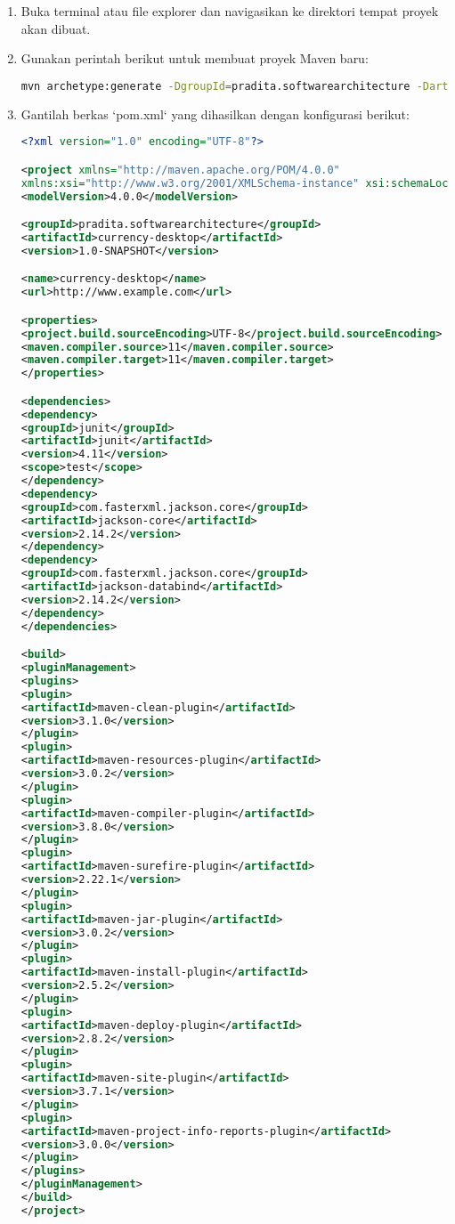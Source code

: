 \begin{enumerate}
\item Buka terminal atau file explorer dan navigasikan ke direktori tempat proyek akan dibuat.
\item Gunakan perintah berikut untuk membuat proyek Maven baru:

\begin{lstlisting}[language=bash]
mvn archetype:generate -DgroupId=pradita.softwarearchitecture -DartifactId=currency-desktop -DarchetypeArtifactId=maven-archetype-quickstart -DinteractiveMode=false
\end{lstlisting}

\item Gantilah berkas `pom.xml` yang dihasilkan dengan konfigurasi berikut:

\begin{lstlisting}[language=xml]
<?xml version="1.0" encoding="UTF-8"?>

<project xmlns="http://maven.apache.org/POM/4.0.0"
xmlns:xsi="http://www.w3.org/2001/XMLSchema-instance" xsi:schemaLocation="http://maven.apache.org/POM/4.0.0 http://maven.apache.org/xsd/maven-4.0.0.xsd">
<modelVersion>4.0.0</modelVersion>

<groupId>pradita.softwarearchitecture</groupId>
<artifactId>currency-desktop</artifactId>
<version>1.0-SNAPSHOT</version>

<name>currency-desktop</name>
<url>http://www.example.com</url>

<properties>
<project.build.sourceEncoding>UTF-8</project.build.sourceEncoding>
<maven.compiler.source>11</maven.compiler.source>
<maven.compiler.target>11</maven.compiler.target>
</properties>

<dependencies>
<dependency>
<groupId>junit</groupId>
<artifactId>junit</artifactId>
<version>4.11</version>
<scope>test</scope>
</dependency>
<dependency>
<groupId>com.fasterxml.jackson.core</groupId>
<artifactId>jackson-core</artifactId>
<version>2.14.2</version>
</dependency>
<dependency>
<groupId>com.fasterxml.jackson.core</groupId>
<artifactId>jackson-databind</artifactId>
<version>2.14.2</version>
</dependency>
</dependencies>

<build>
<pluginManagement>
<plugins>
<plugin>
<artifactId>maven-clean-plugin</artifactId>
<version>3.1.0</version>
</plugin>
<plugin>
<artifactId>maven-resources-plugin</artifactId>
<version>3.0.2</version>
</plugin>
<plugin>
<artifactId>maven-compiler-plugin</artifactId>
<version>3.8.0</version>
</plugin>
<plugin>
<artifactId>maven-surefire-plugin</artifactId>
<version>2.22.1</version>
</plugin>
<plugin>
<artifactId>maven-jar-plugin</artifactId>
<version>3.0.2</version>
</plugin>
<plugin>
<artifactId>maven-install-plugin</artifactId>
<version>2.5.2</version>
</plugin>
<plugin>
<artifactId>maven-deploy-plugin</artifactId>
<version>2.8.2</version>
</plugin>
<plugin>
<artifactId>maven-site-plugin</artifactId>
<version>3.7.1</version>
</plugin>
<plugin>
<artifactId>maven-project-info-reports-plugin</artifactId>
<version>3.0.0</version>
</plugin>
</plugins>
</pluginManagement>
</build>
</project>
\end{lstlisting}


\end{enumerate}
